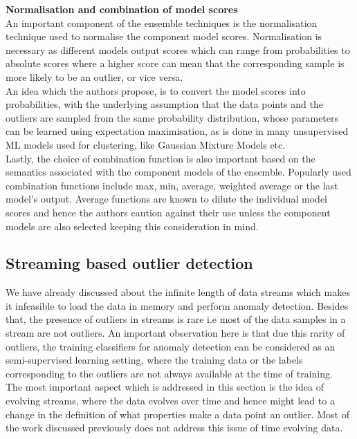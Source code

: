 \noindent \textbf{Normalisation and combination of model scores} \\

An important component of the ensemble techniques is the normalisation technique used to normalise the component model scores. Normalisation is necessary as different models output scores which can range from probabilities to absolute scores where a higher score can mean that the corresponding sample is more likely to be an outlier, or vice versa. \\ 

An idea which the authors propose, is to convert the model scores into probabilities, with the underlying assumption that the data points and the outliers are sampled from the same probability distribution, whose parameters can be learned using expectation maximisation, as is done in many unsupervised ML models used for clustering, like Gaussian Mixture Models etc. \\

Lastly, the choice of combination function is also important based on the semantics associated with the component models of the ensemble. Popularly used combination functions include max, min, average, weighted average or the last model's output. Average functions are known to dilute the individual model scores and hence the authors caution against their use unless the component models are also selected keeping this consideration in mind. 

\subsection{Streaming based outlier detection}

We have already discussed about the infinite length of data streams which makes it infeasible to load the data in memory and perform anomaly detection. Besides that, the presence of outliers in streams is rare i.e most of the data samples in a stream are not outliers. An important observation here is that due this rarity of outliers, the training classifiers for anomaly detection can be considered as an semi-supervised learning setting, where the training data or the labels corresponding to the outliers are not always available at the time of training. \\

The most important aspect which is addressed in this section is the idea of evolving streams, where the data evolves over time and hence might lead to a change in the definition of what properties make a data point an outlier. Most of the work discussed previously does not address this issue of time evolving data. \\

